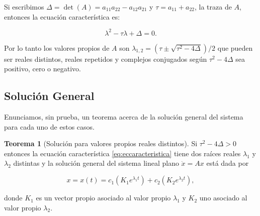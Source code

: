 \documentclass[11pt]{book}
\theoremstyle{definition}
\numberwithin{definition}{section}
\theoremstyle{theorem}
\newtheorem{theorem}{Teorema}
\numberwithin{theorem}{section}
\numberwithin{lemma}{section}
\numberwithin{corollary}{section}
\theoremstyle{plain}
\numberwithin{example}{section}
\begin{document}
Si escribimos $\Delta = \det(A) = a_{11}a_{22} - a_{12}a_{21}$ y $\tau = a_{11} + a_{22}$, la traza de $A$, entonces la ecuación característica es:

\begin{equation} \label{eq:eccaracteristica}
	\lambda^2 - \tau \lambda + \Delta = 0.
\end{equation}

Por lo tanto los valores propios de $A$ son $\lambda_{1,2} = (\tau \pm \sqrt{\tau^2 - 4\Delta}) / 2 $ que pueden ser reales distintos, reales repetidos y complejos conjugados según $\tau^2 - 4\Delta$ sea positivo, cero o negativo.

\subsection{Solución General} \label{subsec:soluciongeneral}

Enunciamos, sin prueba, un teorema acerca de la solución general del sistema para cada uno de estos casos.

\begin{theorem}[Solución para valores propios reales distintos]Si $\tau^2 - 4\Delta > 0$ entonces la ecuación característica \ref{eq:eccaracteristica} tiene dos raíces reales $\lambda_1$ y $\lambda_2$ distintas y la solución general del sistema lineal plano $\dot{x} = Ax$ está dada por

\begin{equation} \label{eq:solvlrspropiosdistintos}
x = x(t) = c_1(K_1 e^{\lambda_1 t}) + c_2(K_2 e^{\lambda_2 t}),
\end{equation}

donde $K_1$ es un vector propio asociado al valor propio $\lambda_1$ y $K_2$ uno asociado al valor propio $\lambda_2$.
\end{theorem}
\end{document}
